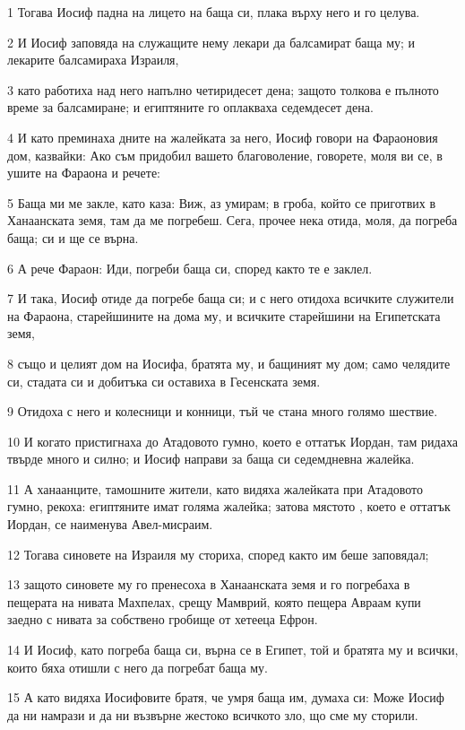 \par 1 Тогава Иосиф падна на лицето на баща си, плака върху него и го целува.
\par 2 И Иосиф заповяда на служащите нему лекари да балсамират баща му; и лекарите балсамираха Израиля,
\par 3 като работиха над него напълно четиридесет дена; защото толкова е пълното време за балсамиране; и египтяните го оплакваха седемдесет дена.
\par 4 И като преминаха дните на жалейката за него, Иосиф говори на Фараоновия дом, казвайки: Ако съм придобил вашето благоволение, говорете, моля ви се, в ушите на Фараона и речете:
\par 5 Баща ми ме закле, като каза: Виж, аз умирам; в гроба, който се приготвих в Ханаанската земя, там да ме погребеш. Сега, прочее нека отида, моля, да погреба баща; си и ще се върна.
\par 6 А рече Фараон: Иди, погреби баща си, според както те е заклел.
\par 7 И така, Иосиф отиде да погребе баща си; и с него отидоха всичките служители на Фараона, старейшините на дома му, и всичките старейшини на Египетската земя,
\par 8 също и целият дом на Иосифа, братята му, и бащиният му дом; само челядите си, стадата си и добитъка си оставиха в Гесенската земя.
\par 9 Отидоха с него и колесници и конници, тъй че стана много голямо шествие.
\par 10 И когато пристигнаха до Атадовото гумно, което е оттатък Иордан, там ридаха твърде много и силно; и Иосиф направи за баща си седемдневна жалейка.
\par 11 А ханаанците, тамошните жители, като видяха жалейката при Атадовото гумно, рекоха: египтяните имат голяма жалейка; затова мястото , което е оттатък Иордан, се наименува Авел-мисраим.
\par 12 Тогава синовете на Израиля му сториха, според както им беше заповядал;
\par 13 защото синовете му го пренесоха в Ханаанската земя и го погребаха в пещерата на нивата Махпелах, срещу Мамврий, която пещера Авраам купи заедно с нивата за собствено гробище от хетееца Ефрон.
\par 14 И Иосиф, като погреба баща си, върна се в Египет, той и братята му и всички, които бяха отишли с него да погребат баща му.
\par 15 А като видяха Иосифовите братя, че умря баща им, думаха си: Може Иосиф да ни намрази и да ни възвърне жестоко всичкото зло, що сме му сторили.
